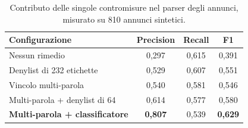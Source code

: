 \begin{table}[htbp]
  \centering
  \caption{Contributo delle singole contromisure nel parser degli annunci,
           misurato su 810 annunci sintetici.}
  \label{tab:job-ablazione}
  \begin{tabular}{lccc}
    \toprule
    \textbf{Configurazione} & \textbf{Precision} & \textbf{Recall} & \textbf{F1} \\
    \midrule
    Nessun rimedio                       & 0,297 & 0,615 & 0,391 \\
    Denylist di 232 etichette            & 0,529 & 0,607 & 0,551 \\
    Vincolo multi-parola                 & 0,540 & 0,581 & 0,546 \\
    Multi-parola + denylist di 64        & 0,614 & 0,577 & 0,580 \\
    \textbf{Multi-parola + classificatore} & \textbf{0,807} & 0,539 & \textbf{0,629} \\
    \bottomrule
  \end{tabular}
\end{table}
